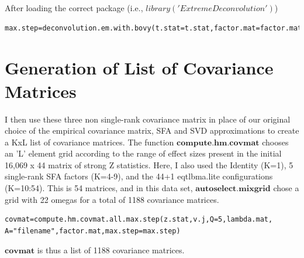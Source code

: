 \documentclass[10pt]{article}
\begin{document}
\begin{itemize}
After loading the correct package (i.e., $library('ExtremeDeconvolution')$)
\begin{verbatim}
max.step=deconvolution.em.with.bovy(t.stat=t.stat,factor.mat=factor.mat,lambda.mat=lambda.mat,K=3,P=3)
\end{verbatim}
%  
%  
%  
%


\section{Generation of List of Covariance Matrices}
I then use these three non single-rank covariance matrix in place of our original choice of the empirical covariance matrix, SFA and SVD approximations to create a KxL list of covariance matrices. The function $\textbf{compute.hm.covmat}$ chooses an 'L' element grid according to the range of effect sizes present in the initial 16,069 x 44 matrix of strong Z statistics. 
Here, I also used the Identity (K=1), 5 single-rank SFA factors (K=4-9), and the 44+1 eqtlbma.lite configurations (K=10:54). This is 54 matrices, and in this data set, $\textbf{autoselect.mixgrid}$ chose a grid with 22 omegas for a total of 1188 covariance matrices.

\begin{verbatim}
covmat=compute.hm.covmat.all.max.step(z.stat,v.j,Q=5,lambda.mat,
A="filename",factor.mat,max.step=max.step)

\end{verbatim}

$\textbf{covmat}$ is thus a list of 1188 covariance matrices.



\end{itemize}
\end{document}
